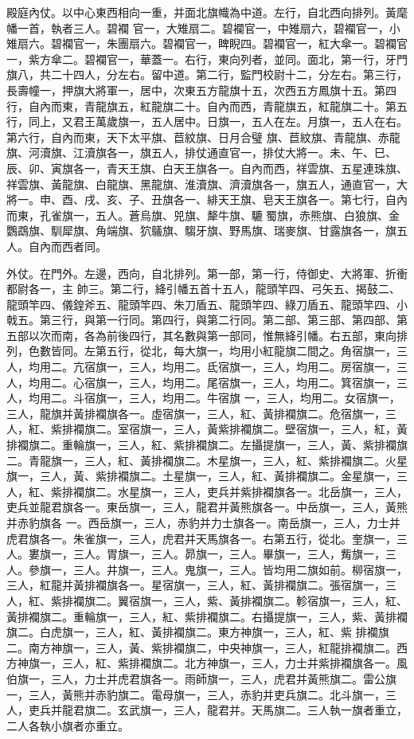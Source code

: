 \begin{pinyinscope}
 殿庭內仗。以中心東西相向一重，并面北旗幟為中道。左行，自北西向排列。黃麾幡一首，執者三人。碧襴
 官一，大雉扇二。碧襴官一，中雉扇六，碧襴官一，小雉扇六。碧襴官一，朱團扇六。碧襴官一，睥睨四。碧襴官一，紅大傘一。碧襴官一，紫方傘二。碧襴官一，華蓋一。右行，東向列者，並同。面北，第一行，牙門旗八，共二十四人，分左右。留中道。第二行，監門校尉十二，分左右。第三行，長壽幢一，押旗大將軍一，居中，次東五方龍旗十五，次西五方鳳旗十五。第四行，自內而東，青龍旗五，紅龍旗二十。自內而西，青龍旗五，紅龍旗二十。第五行，同上，又君王萬歲旗一，五人居中。日旗一，五人在左。月旗一，五人在右。第六行，自內而東，天下太平旗、苣紋旗、日月合璧
 旗、苣紋旗、青龍旗、赤龍旗、河瀆旗、江瀆旗各一，旗五人，排仗通直官一，排仗大將一。未、午、巳、辰、卯、寅旗各一，青天王旗、白天王旗各一。自內而西，祥雲旗、五星連珠旗、祥雲旗、黃龍旗、白龍旗、黑龍旗、淮瀆旗、濟瀆旗各一，旗五人，通直官一，大將一。申、酉、戌、亥、子、丑旗各一、緋天王旗、皂天王旗各一。第七行，自內而東，孔雀旗一，五人。蒼烏旗、兕旗、犛牛旗、騼蜀旗，赤熊旗、白狼旗、金鸚鵡旗、馴犀旗、角端旗、狖鸃旗、騶牙旗、野馬旗、瑞麥旗、甘露旗各一，旗五人。自內而西者同。



 外仗。在門外。左邊，西向，自北排列。第一部，第一行，侍御史、大將軍、折衝都尉各一，主
 帥三。第二行，絳引幡五首十五人，龍頭竿四、弓矢五、揭鼓二、龍頭竿四、儀鍠斧五、龍頭竿四、朱刀盾五、龍頭竿四、綠刀盾五、龍頭竿四、小戟五。第三行，與第一行同。第四行，與第二行同。第二部、第三部、第四部、第五部以次而南，各為前後四行，其名數與第一部同，惟無絳引幡。右五部，東向排列，色數皆同。左第五行，從北，每大旗一，均用小紅龍旗二間之。角宿旗一，三人，均用二。亢宿旗一，三人，均用二。氐宿旗一，三人，均用二。房宿旗一，三人，均用二。心宿旗一，三人，均用二。尾宿旗一，三人，均用二。箕宿旗一，三人，均用二。斗宿旗一，三人，均用二。牛宿旗
 一，三人，均用二。女宿旗一，三人，龍旗并黃排襴旗各一。虛宿旗一，三人，紅、黃排襴旗二。危宿旗一，三人，紅、紫排襴旗二。室宿旗一，三人，黃紫排襴旗二。壁宿旗一，三人，紅，黃排襴旗二。重輪旗一，三人，紅、紫排襴旗二。左攝提旗一，三人，黃、紫排襴旗二。青龍旗一，三人，紅、黃排襴旗二。木星旗一，三人，紅、紫排襴旗二。火星旗一，三人，黃、紫排襴旗二。土星旗一，三人，紅、黃排襴旗二。金星旗一，三人，紅、紫排襴旗二。水星旗一，三人，吏兵并紫排襴旗各一。北岳旗一，三人，吏兵並龍君旗各一。東岳旗一，三人，龍君并黃熊旗各一。中岳旗一，三人，黃熊并赤豹旗各
 一。西岳旗一，三人，赤豹并力士旗各一。南岳旗一，三人，力士并虎君旗各一。朱雀旗一，三人，虎君并天馬旗各一。右第五行，從北。奎旗一，三人。婁旗一，三人。胃旗一，三人。昴旗一，三人。畢旗一，三人，觜旗一，三人。參旗一，三人。井旗一，三人。鬼旗一，三人。皆均用二旗如前。柳宿旗一，三人，紅龍并黃排襴旗各一。星宿旗一，三人，紅、黃排襴旗二。張宿旗一，三人，紅、紫排襴旗二。翼宿旗一，三人，紫、黃排襴旗二。軫宿旗一，三人，紅、黃排襴旗二。重輪旗一，三人，紅、紫排襴旗二。右攝提旗一，三人，紫、黃排襴旗二。白虎旗一，三人，紅、黃排襴旗二。東方神旗一，三人，紅、紫
 排襴旗二。南方神旗一，三人，黃、紫排襴旗二，中央神旗一，三人，紅龍排襴旗二。西方神旗一，三人，紅、紫排襴旗二。北方神旗一，三人，力士并紫排襴旗各一。風伯旗一，三人，力士并虎君旗各一。雨師旗一，三人，虎君并黃熊旗二。雷公旗一，三人，黃熊并赤豹旗二。電母旗一，三人，赤豹并吏兵旗二。北斗旗一，三人，吏兵并龍君旗二。玄武旗一，三人，龍君并。天馬旗二。三人執一旗者重立，二人各執小旗者亦重立。




\end{pinyinscope}
